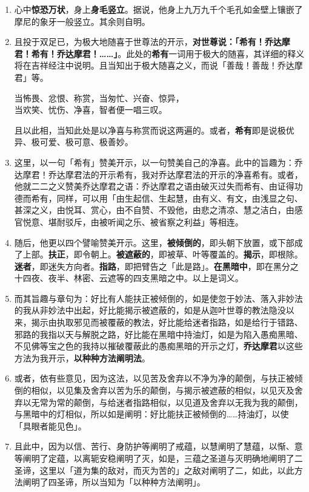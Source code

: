 \begin{enumerate}\item 心中\textbf{惊恐万状}，身上\textbf{身毛竖立}。据说，他身上九万九千个毛孔如金壁上镶嵌了摩尼的象牙一般竖立。其余则自明。
\item 且投于双足已，为极大地随喜于世尊法的开示，\textbf{对世尊说：「希有！乔达摩君！希有！乔达摩君！……」}。此处的\textbf{希有}一词用于极大的随喜，其详细的释义将在吉祥经注中说明。且当知出于极大随喜之义，而说「善哉！善哉！乔达摩君」等。\begin{quoting}当怖畏、忿恨、称赏，当匆忙、兴奋、惊异，\\当欢笑、忧伤、净喜，智者便一唱三叹。\end{quoting}且以此相，当知此处是以净喜与称赏而说这两遍的。或者，\textbf{希有}即是说极优异、极可爱、极可意、极善妙。
\item 这里，以一句「希有」赞美开示，以一句赞美自己的净喜。此中的旨趣为：乔达摩君！乔达摩君法的开示希有，我对乔达摩君法的开示的净喜希有。或者，他就二二之义赞美乔达摩君之语：乔达摩君之语由破灭过失而希有、由证得功德而希有，同样，可以用「由生起信、生起慧，由有义、有文，由浅显之句、甚深之义，由悦耳、赏心，由不自赞、不毁他，由悲之清凉、慧之洁白，由感官悦意、堪耐驳斥，由被听闻之乐、被省察之利益」等相连。
\item 随后，他更以四个譬喻赞美开示。这里，\textbf{被倾倒的}，即头朝下放置，或下部成了上部。\textbf{扶正}，即令朝上。\textbf{被遮蔽的}，即被草、叶等覆盖的。\textbf{揭示}，即根除。\textbf{迷者}，即迷失方向者。\textbf{指路}，即把臂告之「此是路」。\textbf{在黑暗中}，即在黑分之十四夜、夜半、林密、云遮等的四支黑暗之中。以上是词义。
\item 而其旨趣与章句为：好比有人能扶正被倾倒的，如是使忽于妙法、落入非妙法的我从非妙法中出起，好比能揭示被遮蔽的，如是从迦叶世尊的教法隐没以来，揭示由执取邪见而被覆蔽的教法，好比能给迷者指路，如是给行于错路、邪路的我指以天与解脱之路，好比能在黑暗中持油灯，如是为陷入愚痴黑暗、不见佛等宝之色的我持以摧破覆蔽此的愚痴黑暗的开示之灯，\textbf{乔达摩君}以这些方法为我开示，\textbf{以种种方法阐明法}。
\item 或者，依有些意见，因为这法，以见苦及舍弃以不净为净的颠倒，与扶正被倾倒的相似，以见集及舍弃以苦为乐的颠倒，与揭示被遮蔽的相似，以见灭及舍弃以无常为常的颠倒，与给迷者指路相似，以见道及舍弃以无我为我的颠倒，与黑暗中的灯相似，所以如是阐明：好比能扶正被倾倒的……持油灯，以使「具眼者能见色」。
\item 且此中，因为以信、苦行、身防护等阐明了戒蕴，以慧阐明了慧蕴，以惭、意等阐明了定蕴，以离轭安稳阐明了灭，如是，三蕴之圣道与灭明确地阐明了二圣谛，这里以「道为集的敌对，而灭为苦的」之敌对阐明了二，如此，以此方法阐明了四圣谛，所以当知为「以种种方法阐明」。

\end{enumerate}
